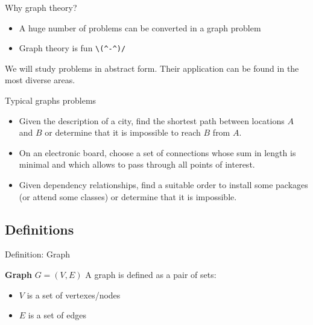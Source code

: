 \documentclass[compress]{beamer}
\begin{document}
\begin{frame}[fragile]{Why graph theory?}
  \begin{alertblock}{}
    \begin{itemize}
    \item A huge number of problems can be converted in a graph problem
    \item Graph theory is fun \verb|\(^-^)/|
    \end{itemize}
  \end{alertblock}
  We will study problems in abstract form. Their application can be found in the most diverse areas.
\end{frame}

\begin{frame}{Typical graphs problems}
  \begin{itemize}
  \item Given the description of a city, find the shortest path between locations $A$ and $B$ or determine that it is impossible to reach $B$ from $A$.
  \item On an electronic board, choose a set of connections whose sum in length is minimal and which allows to pass through all points of interest.
  \item Given dependency relationships, find a suitable order to install some packages (or attend some classes) or determine that it is impossible.
  \end{itemize}
\end{frame}

\subsection{Definitions}
\begin{frame}{Definition: Graph}
  \begin{block}{\textbf{Graph} $G = (V, E)$}
    A graph is defined as a pair of sets:
    \begin{itemize}
    \item $V$ is a set of {\color{red}vertexes}/{\color{red}nodes}
    \item $E$ is a set of {\color{red}edges}
  \end{itemize}
\end{block}
\end{frame}
\end{document}
